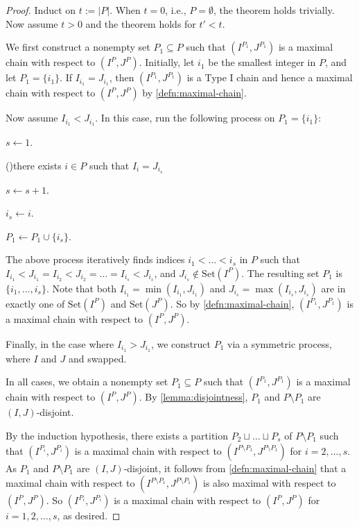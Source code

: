 \documentclass[11pt]{article}
\theoremstyle{plain}
\theoremstyle{definition}
\theoremstyle{remark}
\newcommand{\range}{\mathrm{Set}}
\begin{document}
\begin{proof}
Induct on $t:=|P|$. When $t=0$, i.e., $P=\emptyset$, the theorem holds trivially. Now assume $t>0$ and the theorem holds for $t'<t$.

We first construct a nonempty set $P_1\subseteq P$ such that $(I^{P_1},J^{P_1})$ is a maximal chain with respect to $(I^P,J^P)$. Initially, let $i_1$ be the smallest integer in $P$, and let $P_1=\{i_1\}$.
If $I_{i_1}=J_{i_1}$, then $(I^{P_1},J^{P_1})$ is a Type I chain and hence a maximal chain with respect to $(I^P,J^P)$ by \cref{defn:maximal-chain}.

Now assume $I_{i_1}<J_{i_1}$. In this case, run the following process on $P_1=\{i_1\}$:  
{
\setlength{\interspacetitleruled}{0pt}\setlength{\algotitleheightrule}{0pt}\begin{algorithm}[htb]	
$s\gets 1$.

\While(){there exists $i\in P$ such that $I_{i}=J_{i_s}$}{
$s\gets s+1$.

$i_s\gets i$.

$P_1\gets P_1\cup\{i_s\}$.
}
\end{algorithm}
}


The above process iteratively finds indices $i_1<\dots<i_s$ in $P$ such that $I_{i_1}<J_{i_1}=I_{i_2}<J_{i_2}=\dots=I_{i_s}<J_{i_s}$, and $J_{i_s}\not\in\range(I^{P})$. The resulting set $P_1$ is $\{i_1,\dots,i_s\}$. 
Note that both $I_{i_1}=\min(I_{i_1},J_{i_1})$ and $J_{i_s}=\max(I_{i_s}, J_{i_s})$ are in exactly one of $\range(I^{P})$ and $\range(J^{P})$. 
So by \cref{defn:maximal-chain}, $(I^{P_1}, J^{P_1})$ is a maximal chain with respect to $(I^P, J^P)$.

Finally, in the case where $I_{i_1}>J_{i_1}$, we construct $P_1$ via a symmetric process, where $I$ and $J$ and swapped. 

In all cases, we obtain a nonempty set $P_1\subseteq P$ such that $(I^{P_1},J^{P_1})$ is a maximal chain with respect to $(I^P,J^P)$. 
By \cref{lemma:disjointness}, $P_1$ and $P\setminus P_1$ are $(I,J)$-disjoint.

By the induction hypothesis, there exists a partition $P_2\sqcup \dots\sqcup P_s$ of $P\setminus P_1$ such that $(I^{P_i},J^{P_i})$ is a maximal chain with respect to $(I^{P\setminus P_1},J^{P\setminus P_1})$ for $i=2,\dots,s$. 
As $P_1$ and $P\setminus P_1$ are $(I,J)$-disjoint, it follows from \cref{defn:maximal-chain} that a maximal chain with respect to $(I^{P\setminus P_1},J^{P\setminus P_1})$ is also maximal with respect to $(I^P,J^P)$.
So $(I^{P_i},J^{P_i})$ is a maximal chain with respect to $(I^P,J^P)$ for $i=1,2,\dots,s$, as desired. 
\end{proof}
\end{document}
